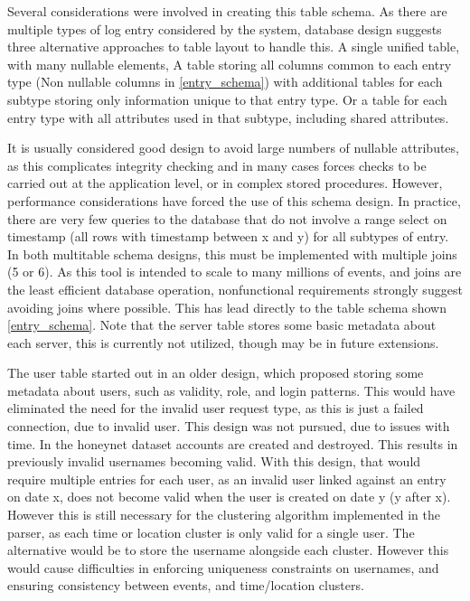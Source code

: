 Several considerations were involved in creating this table schema. As there are multiple types of log entry considered by the system, database design suggests three alternative approaches to table layout to handle this. A single unified table, with many nullable elements, A table storing all columns common to each entry type (Non nullable columns in \ref{entry_schema}) with additional tables for each subtype storing only information unique to that entry type. Or a table for each entry type with all attributes used in that subtype, including shared attributes.

It is usually considered good design to avoid large numbers of nullable attributes, as this complicates integrity checking and in many cases forces checks to be carried out at the application level, or in complex stored procedures. However, performance considerations have forced the use of this schema design. In practice, there are very few queries to the database that do not involve a range select on timestamp (all rows with timestamp between x and y) for all subtypes of entry. In both multitable schema designs, this must be implemented with multiple joins (5 or 6). As this tool is intended to scale to many millions of events, and joins are the least efficient database operation, nonfunctional requirements strongly suggest avoiding joins where possible. This has lead directly to the table schema shown \ref{entry_schema}. Note that the server table stores some basic metadata about each server, this is currently not utilized, though may be in future extensions.

The user table started out in an older design, which proposed storing some metadata about users, such as validity, role, and login patterns. This would have eliminated the need for the invalid user request type, as this is just a failed connection, due to invalid user. This design was not pursued, due to issues with time. In the honeynet dataset accounts are created and destroyed. This results in previously invalid usernames becoming valid. With this design, that would require multiple entries for each user, as an invalid user linked against an entry on date x, does not become valid when the user is created on date y (y after x). However this is still necessary for the clustering algorithm implemented in the parser, as each time or location cluster is only valid for a single user. The alternative would be to store the username alongside each cluster. However this would cause difficulties in enforcing uniqueness constraints on usernames, and ensuring consistency between events, and time/location clusters. 

